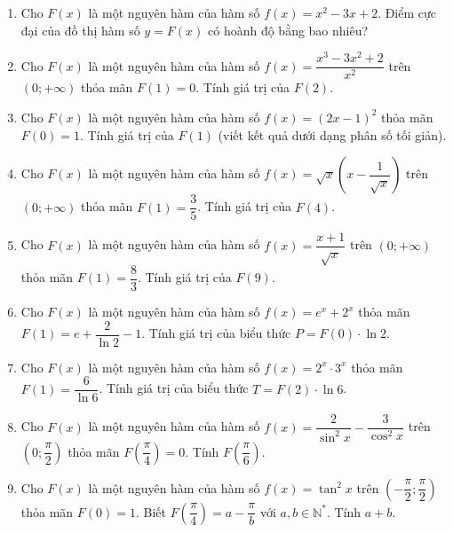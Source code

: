 \documentclass[12pt]{article}
\begin{document}
\begin{enumerate}[label=\textbf{Câu \arabic*.}, start=1]
		
		\item Cho $F(x)$ là một nguyên hàm của hàm số $f(x) = x^2 - 3x + 2$. Điểm cực đại của đồ thị hàm số $y = F(x)$ có hoành độ bằng bao nhiêu?
		
		\item Cho $F(x)$ là một nguyên hàm của hàm số $f(x) = \dfrac{x^3 - 3x^2 + 2}{x^2}$ trên $(0; +\infty)$ thỏa mãn $F(1) = 0$. Tính giá trị của $F(2)$.
		
		
		\item Cho $F(x)$ là một nguyên hàm của hàm số $f(x) = (2x - 1)^2$ thỏa mãn $F(0) = 1$. Tính giá trị của $F(1)$ (viết kết quả dưới dạng phân số tối giản).
		
		
		\item Cho $F(x)$ là một nguyên hàm của hàm số $f(x) = \sqrt{x} \left( x - \dfrac{1}{\sqrt{x}} \right)$ trên $(0; +\infty)$ thỏa mãn $F(1) = \dfrac{3}{5}$. Tính giá trị của $F(4)$.
		
		
		\item Cho $F(x)$ là một nguyên hàm của hàm số $f(x) = \dfrac{x + 1}{\sqrt{x}}$ trên $(0; +\infty)$ thỏa mãn $F(1) = \dfrac{8}{3}$. Tính giá trị của $F(9)$.
		
		
		\item Cho $F(x)$ là một nguyên hàm của hàm số $f(x) = e^x + 2^x$ thỏa mãn $F(1) = e + \dfrac{2}{\ln 2} - 1$. Tính giá trị của biểu thức $P = F(0) \cdot \ln 2$.
		
		
		\item Cho $F(x)$ là một nguyên hàm của hàm số $f(x) = 2^x \cdot 3^x$ thỏa mãn $F(1) = \dfrac{6}{\ln 6}$. Tính giá trị của biểu thức $T = F(2) \cdot \ln 6$.
		
		
		\item Cho $F(x)$ là một nguyên hàm của hàm số $f(x) = \dfrac{2}{\sin^2 x} - \dfrac{3}{\cos^2 x}$ trên $\left(0; \dfrac{\pi}{2}\right)$ thỏa mãn $F\left(\dfrac{\pi}{4}\right) = 0$. Tính $F\left(\dfrac{\pi}{6}\right)$.
		
		
		\item Cho $F(x)$ là một nguyên hàm của hàm số $f(x) = \tan^2 x$ trên $\left(-\dfrac{\pi}{2}; \dfrac{\pi}{2}\right)$ thỏa mãn $F(0) = 1$. Biết $F\left(\dfrac{\pi}{4}\right) = a - \dfrac{\pi}{b}$ với $a, b \in \mathbb{N}^*$. Tính $a + b$.
		

\end{enumerate}
\end{document}
